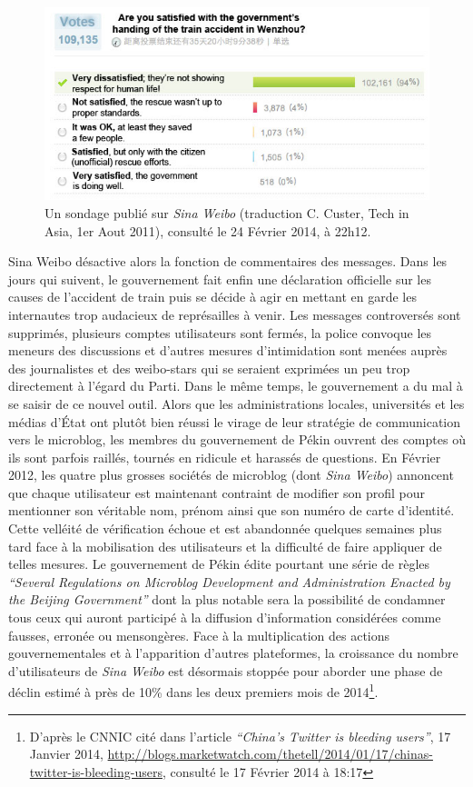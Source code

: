 \begin{figure}[htbp]
    \centering
    \includegraphics[scale=0.7]{figures/chap1/train.jpg}
    \caption[Sondage Weibo concernant l'accident de train de Wenzhou]{Un sondage publié sur \textit{Sina Weibo} (traduction C. Custer, Tech in Asia, 1er Aout 2011), consulté le 24 Février 2014, à 22h12.}
    \label{fig:poll_weibo}
\end{figure}

Sina Weibo désactive alors la fonction de commentaires des messages. Dans les jours qui suivent, le gouvernement fait enfin une déclaration officielle sur les causes de l’accident de train puis se décide à agir en mettant en garde les internautes trop audacieux de représailles à venir. Les messages controversés sont supprimés, plusieurs comptes utilisateurs sont fermés, la police convoque les meneurs des discussions et d’autres mesures d’intimidation sont menées auprès des journalistes et des weibo-stars qui se seraient exprimées un peu trop directement à l’égard du Parti. Dans le même temps, le gouvernement a du mal à se saisir de ce nouvel outil. Alors que les administrations locales, universités et les médias d’État ont plutôt bien réussi le virage de leur stratégie de communication vers le microblog, les membres du gouvernement de Pékin ouvrent des comptes où ils sont parfois raillés, tournés en ridicule et harassés de questions. En Février 2012, les quatre plus grosses sociétés de microblog (dont \textit{Sina Weibo}) annoncent que chaque utilisateur est maintenant contraint de modifier son profil pour mentionner son véritable nom, prénom ainsi que son numéro de carte d’identité. Cette velléité de vérification échoue et est abandonnée quelques semaines plus tard face à la mobilisation des utilisateurs et la difficulté de faire appliquer de telles mesures. Le gouvernement de Pékin édite pourtant une série de règles \textit{“Several Regulations on Microblog Development and Administration Enacted by the Beijing Government”} dont la plus notable sera la possibilité de condamner tous ceux qui auront participé à la diffusion d’information considérées comme fausses, erronée ou mensongères. Face à la multiplication des actions gouvernementales et à l’apparition d’autres plateformes, la croissance du nombre d’utilisateurs de \textit{Sina Weibo} est désormais stoppée pour aborder une phase de déclin estimé à près de 10\% dans les deux premiers mois de 2014\footnote{D’après le CNNIC cité dans l’article  \textit{“China’s Twitter is bleeding users”}, 17 Janvier 2014, \url{http://blogs.marketwatch.com/thetell/2014/01/17/chinas-twitter-is-bleeding-users}, consulté le 17 Février 2014 à 18:17}. 

